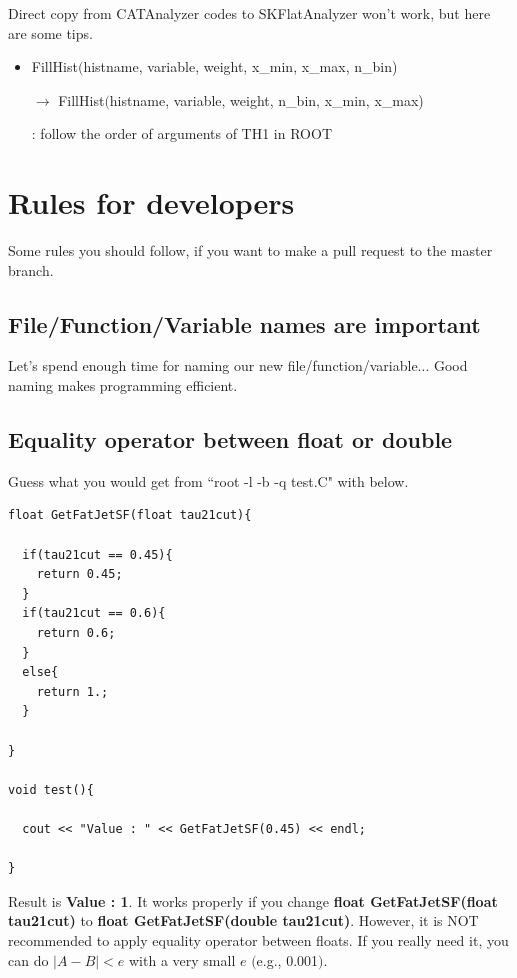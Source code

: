 \documentclass[12pt, a4paper, titlepage]{article}
\begin{document}
Direct copy from CATAnalyzer codes to SKFlatAnalyzer won't work, but here are some tips.

\begin{itemize}

\item FillHist$($histname, variable, weight, x\_min, x\_max, n\_bin) \par
      $\rightarrow$ FillHist$($histname, variable, weight, n\_bin, x\_min, x\_max) \par
      : follow the order of arguments of TH1 in ROOT

\end{itemize}

\clearpage

\section{Rules for developers}

Some rules you should follow, if you want to make a pull request to the master branch.

\subsection{File/Function/Variable names are important}

Let's spend enough time for naming our new file/function/variable...
Good naming makes programming efficient.

\subsection{Equality operator between float or double}

Guess what you would get from ``root -l -b -q test.C" with below.

\begin{lstlisting}
float GetFatJetSF(float tau21cut){
  
  if(tau21cut == 0.45){
    return 0.45;
  }
  if(tau21cut == 0.6){
    return 0.6;
  }
  else{
    return 1.;
  }

}

void test(){

  cout << "Value : " << GetFatJetSF(0.45) << endl;

}

\end{lstlisting}

Result is \textbf{Value : 1}.
It works properly if you change \textbf{float GetFatJetSF(float tau21cut)} to \textbf{float GetFatJetSF(double tau21cut)}.
However, it is NOT recommended to apply equality operator between floats.
If you really need it, you can do $|A-B|<e$ with a very small $e$ $($e.g., 0.001$)$.
\end{document}
